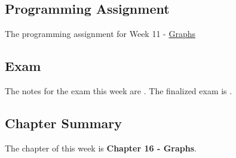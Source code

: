 \subsection{Programming Assignment}

The programming assignment for Week 11 - \href{https://github.com/QuantumCompiler/CU/tree/main/CSPB%202270%20-%20Data%20Structures/CSPB%202270%20-%20Programming%20Assignments/CSPB%202270%20-%20Assignment%209%20-%20Graphs}{Graphs}

\subsection{Exam}

The notes for the exam this week are . The finalized exam is .

\subsection{Chapter Summary}

The chapter of this week is \textbf{Chapter 16 - Graphs}.


